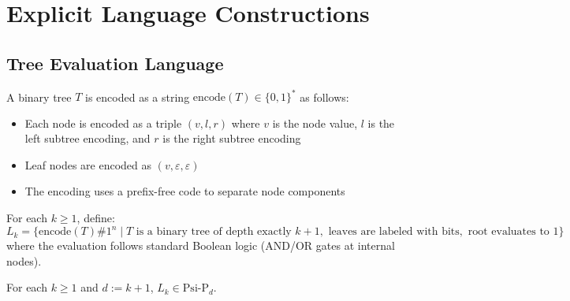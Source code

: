 \section{Explicit Language Constructions}

\subsection{Tree Evaluation Language}

\begin{definition}
A binary tree $T$ is encoded as a string $\text{encode}(T) \in \{0,1\}^*$ as follows:
\begin{itemize}
\item Each node is encoded as a triple $(v, l, r)$ where $v$ is the node value, $l$ is the left subtree encoding, and $r$ is the right subtree encoding
\item Leaf nodes are encoded as $(v, \varepsilon, \varepsilon)$
\item The encoding uses a prefix-free code to separate node components
\end{itemize}
\end{definition}

\begin{definition}
For each $k \geq 1$, define:
$$L_k = \{\text{encode}(T)\#1^n \mid T \text{ is a binary tree of depth exactly } k+1, \text{ leaves are labeled with bits}, \text{ root evaluates to } 1\}$$
where the evaluation follows standard Boolean logic (AND/OR gates at internal nodes).
\end{definition}

\begin{claim}
For each $k \geq 1$ and $d := k{+}1$, $L_k \in \text{Psi-P}_{d}$.
\end{claim}

